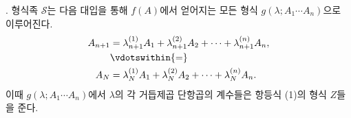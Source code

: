 
. 형식족 $\mathcal S$는 다음 대입을 통해 $f(A)$에서 얻어지는 모든 형식 $g(\lambda;A_1\cdots A_n)$으로 이루어진다.
\[
\begin{aligned}
 A_{n+1}&=\lambda_{n+1}^{(1)}A_1+\lambda_{n+1}^{(2)}A_2+
        \cdots+\lambda_{n+1}^{(n)}A_n,\\
 &\vdotswithin{=}\\
 A_N&=\lambda_N^{(1)}A_1+\lambda_N^{(2)}A_2+
        \cdots+\lambda_N^{(n)}A_n.
\end{aligned}
\]
이때 $g(\lambda;A_1\cdots A_n)$에서 $\lambda$의 각 거듭제곱 단항곱의 계수들은 항등식 (1)의 형식 $Z$들을 준다.
